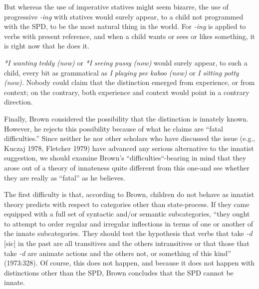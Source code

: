 But whereas the use of imperative statives might seem bizarre, the use of progressive \textit{-ing} with statives would surely appear, to a child not programmed with the SPD, to be the most natural thing in the world. For \textit{-ing} is applied to verbs with present reference, and when a child wants or sees or likes something, it is right now that he does it.

\textit{*I wanting} \textit{teddy} \textit{(now}\textit{)} or \textit{*I} \textit{seeing} \textit{pussy} \textit{(now}\textit{)} would surely appear, to such a child, every bit as grammatical as \textit{I} \textit{playing} \textit{pee} \textit{k}\textit{aboo} \textit{(now}\textit{)} or \textit{I} \textit{sitting} \textit{potty} \textit{(}\textit{now)}\textit{.} Nobody could claim that the distinction emerged from experience, or from context; on the contrary, both experience and context would point in a contrary direction.

Finally, Brown considered the possibility that the distinction is innately known. However, he rejects this possibility because of what he claims are ``fatal difficulties.'' Since neither he nor other scholars who have discussed the issue (e.g., Kuczaj 1978, Fletcher 1979) have advanced any serious alternative to the innatist suggestion, we should examine Brown's ``difficulties``-bearing in mind that they arose out of a theory of innateness quite different from this one-and see whether they are really as ``fatal'' as he believes.

The first difficulty is that, according to Brown, children do not behave as innatist theory predicts with respect to categories other than state-process. If they came equipped with a full set of syntactic and/or semantic subcategories, ``they ought to attempt to order regular and irregular inflections in terms of one or another of the innate subcate\-gories. They should test the hypothesis that verbs that take \textit{-d }[sic] in the past are all transitives and the others intransitives or that those that take \textit{-d} are animate actions and the others not, or something of this kind'' (1973:328). Of course, this does not happen, and because it does not happen with distinctions other than the SPD, Brown con\-cludes that the SPD cannot be innate.

